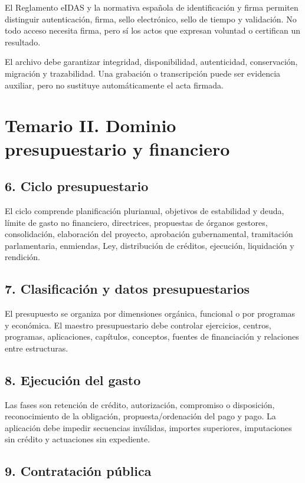 \documentclass[11pt,a4paper]{article}
\begin{document}
El Reglamento eIDAS y la normativa española de identificación y firma permiten distinguir autenticación, firma, sello electrónico, sello de tiempo y validación. No todo acceso necesita firma, pero sí los actos que expresan voluntad o certifican un resultado.

El archivo debe garantizar integridad, disponibilidad, autenticidad, conservación, migración y trazabilidad. Una grabación o transcripción puede ser evidencia auxiliar, pero no sustituye automáticamente el acta firmada.

\section{Temario II. Dominio presupuestario y financiero}

\subsection{6. Ciclo presupuestario}

El ciclo comprende planificación plurianual, objetivos de estabilidad y deuda, límite de gasto no financiero, directrices, propuestas de órganos gestores, consolidación, elaboración del proyecto, aprobación gubernamental, tramitación parlamentaria, enmiendas, Ley, distribución de créditos, ejecución, liquidación y rendición.

\subsection{7. Clasificación y datos presupuestarios}

El presupuesto se organiza por dimensiones orgánica, funcional o por programas y económica. El maestro presupuestario debe controlar ejercicios, centros, programas, aplicaciones, capítulos, conceptos, fuentes de financiación y relaciones entre estructuras.

\subsection{8. Ejecución del gasto}

Las fases son retención de crédito, autorización, compromiso o disposición, reconocimiento de la obligación, propuesta/ordenación del pago y pago. La aplicación debe impedir secuencias inválidas, importes superiores, imputaciones sin crédito y actuaciones sin expediente.

\subsection{9. Contratación pública}
\end{document}
